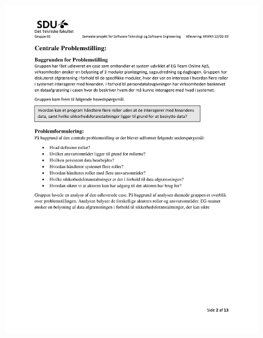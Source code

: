 \begin{figure}[hb]
  \includegraphics[scale = 0.33]{./PNG/Projektforslag/Projektforslag-02.jpg} 
\end{figure}

